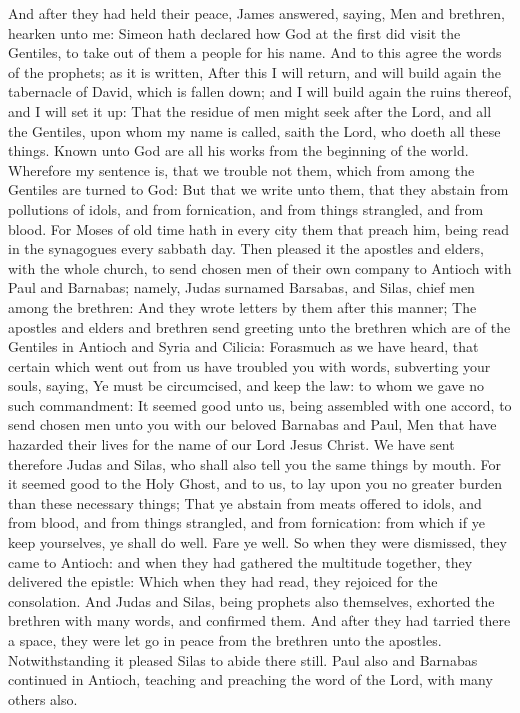  And after they had held their peace, James answered,
saying, Men and brethren, hearken unto me:  Simeon hath
declared how God at the first did visit the Gentiles, to take out of
them a people for his name.  And to this agree the words
of the prophets; as it is written,  After this I will
return, and will build again the tabernacle of David, which is fallen
down; and I will build again the ruins thereof, and I will set it up:
 That the residue of men might seek after the Lord, and
all the Gentiles, upon whom my name is called, saith the Lord, who doeth
all these things.  Known unto God are all his works from
the beginning of the world.  Wherefore my sentence is,
that we trouble not them, which from among the Gentiles are turned to
God:  But that we write unto them, that they abstain from
pollutions of idols, and from fornication, and from things strangled,
and from blood.  For Moses of old time hath in every city
them that preach him, being read in the synagogues every sabbath day.
 Then pleased it the apostles and elders, with the whole
church, to send chosen men of their own company to Antioch with Paul and
Barnabas; namely, Judas surnamed Barsabas, and Silas, chief men among
the brethren:  And they wrote letters by them after this
manner; The apostles and elders and brethren send greeting unto the
brethren which are of the Gentiles in Antioch and Syria and Cilicia:
 Forasmuch as we have heard, that certain which went out
from us have troubled you with words, subverting your souls, saying, Ye
must be circumcised, and keep the law: to whom we gave no such
commandment:  It seemed good unto us, being assembled
with one accord, to send chosen men unto you with our beloved Barnabas
and Paul,  Men that have hazarded their lives for the
name of our Lord Jesus Christ.  We have sent therefore
Judas and Silas, who shall also tell you the same things by mouth.
 For it seemed good to the Holy Ghost, and to us, to lay
upon you no greater burden than these necessary things; 
That ye abstain from meats offered to idols, and from blood, and from
things strangled, and from fornication: from which if ye keep
yourselves, ye shall do well. Fare ye well.  So when they
were dismissed, they came to Antioch: and when they had gathered the
multitude together, they delivered the epistle:  Which
when they had read, they rejoiced for the consolation. 
And Judas and Silas, being prophets also themselves, exhorted the
brethren with many words, and confirmed them.  And after
they had tarried there a space, they were let go in peace from the
brethren unto the apostles.  Notwithstanding it pleased
Silas to abide there still.  Paul also and Barnabas
continued in Antioch, teaching and preaching the word of the Lord, with
many others also.

